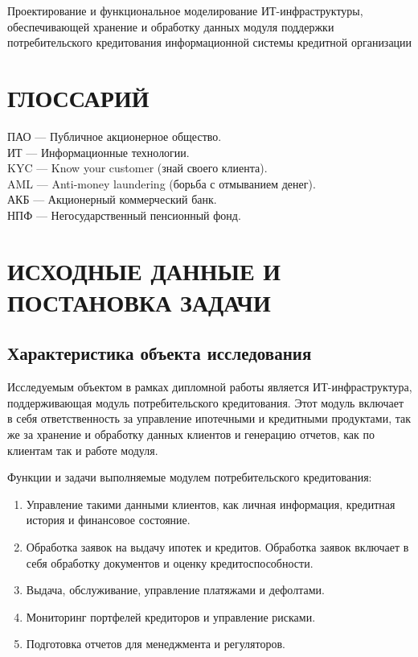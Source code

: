 \documentclass[14pt, a4paper]{extarticle}
\begin{document}
Проектирование и функциональное моделирование ИТ-инфраструктуры, обеспечивающей
хранение и обработку данных модуля поддержки потребительского кредитования
информационной системы кредитной организации

\section*{ГЛОССАРИЙ}
{}
\begin{raggedright}
	ПАО --- Публичное акционерное общество. \\ 
	ИТ --- Информационные технологии. \\ 
	KYC --- Know your customer (знай своего клиента). \\
	AML --- Anti-money laundering (борьба с отмыванием денег). \\
	АКБ --- Акционерный коммерческий банк. \\
	НПФ --- Негосударственный пенсионный фонд. \\
\end{raggedright}

\section{ИСХОДНЫЕ ДАННЫЕ И ПОСТАНОВКА ЗАДАЧИ}

\subsection{Характеристика объекта исследования}

Исследуемым объектом в рамках дипломной работы является ИТ-инфраструктура,
поддерживающая модуль потребительского кредитования. Этот модуль включает в
себя ответственность за управление ипотечными и кредитными продуктами, так же
за хранение и обработку данных клиентов и генерацию отчетов, как по клиентам
так и работе модуля.

Функции и задачи выполняемые модулем потребительского кредитования:
\begin{enumerate}
	\item Управление такими данными клиентов, как личная информация, кредитная
история и финансовое состояние.
	\item Обработка заявок на выдачу ипотек и кредитов. Обработка заявок включает
в себя обработку документов и оценку кредитоспособности.
	\item Выдача, обслуживание, управление платяжами и дефолтами.
	\item Мониторинг портфелей кредиторов и управление рисками.
	\item Подготовка отчетов для менеджмента и регуляторов.
\end{enumerate}
\end{document}
